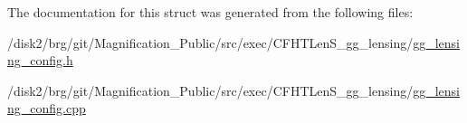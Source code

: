 The documentation for this struct was generated from the following files\-:\begin{DoxyCompactItemize}
\item 
/disk2/brg/git/\-Magnification\-\_\-\-Public/src/exec/\-C\-F\-H\-T\-Len\-S\-\_\-gg\-\_\-lensing/\hyperlink{gg__lensing__config_8h}{gg\-\_\-lensing\-\_\-config.\-h}\item 
/disk2/brg/git/\-Magnification\-\_\-\-Public/src/exec/\-C\-F\-H\-T\-Len\-S\-\_\-gg\-\_\-lensing/\hyperlink{gg__lensing__config_8cpp}{gg\-\_\-lensing\-\_\-config.\-cpp}\end{DoxyCompactItemize}
